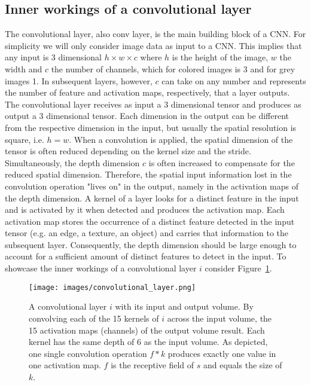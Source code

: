\documentclass[a4paper,12pt]{report}
\begin{document}
\subsection{Inner workings of a convolutional layer}\label{subsec:innerworkconvl}
The convolutional layer, also conv layer, is the main building block of a CNN. For simplicity we will only consider image data as input to a CNN. This implies that any input is 3 dimensional $h \times w \times c$ where $h$ is the height of the image, $w$ the width and $c$ the number of channels, which for colored images is 3 and for grey images 1.  In subsequent layers, however, $c$ can take on any number and represents the number of feature and activation maps, respectively, that a layer outputs. The convolutional layer receives as input a 3 dimensional tensor and produces as output a 3 dimensional tensor. Each dimension in the output can be different from the respective dimension in the input, but usually the spatial resolution is square, i.e. $h = w$. When a convolution is applied, the spatial dimension of the tensor is often reduced depending on the kernel size and the stride. Simultaneously, the depth dimension $c$ is often increased to compensate for the reduced spatial dimension. Therefore, the spatial input information lost in the convolution operation "lives on" in the output, namely in the activation maps of the depth dimension. A kernel of a layer looks for a distinct feature in the input and is activated by it when detected and produces the activation map. Each activation map stores the occurrence of a distinct feature detected in the input tensor (e.g. an edge, a texture, an object) and carries that information to the subsequent layer. Consequently, the depth dimension should be large enough to account for a sufficient amount of distinct features to detect in the input. To showcase the inner workings of a convolutional layer $i$ consider Figure~\ref{fig:conv_layer}. 
\begin{figure}[ht]
\centering
\texttt{[image: images/convolutional\_layer.png]}
\caption{A convolutional layer $i$ with its input and output volume. By convolving each of the 15 kernels of $i$ across the input volume, the 15 activation maps (channels) of the output volume result. Each kernel has the same depth of 6 as the input volume. As depicted, one single convolution operation $f * k$ produces exactly one value in one activation map. $f$ is the receptive field of $s$ and equals the size of $k$.}
\label{fig:conv_layer}
\end{figure}
\end{document}
